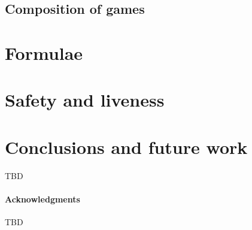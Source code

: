 \documentclass[]{acm_proc_article-sp}
\numberwithin{equation}{subsection}
\begin{document}
\subsection{Composition of games}

\section{Formulae}

\section{Safety and liveness}

\section{Conclusions and future work}

TBD

\paragraph{Acknowledgments}

TBD







\end{document}
